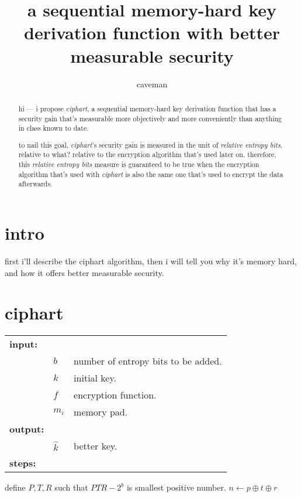 \documentclass{article}
\author{caveman}
\title{a sequential memory-hard key derivation function with better
measurable security}
\begin{document}
\maketitle
\begin{abstract}
hi --- i propose \emph{ciphart}, a sequential memory-hard key derivation
function that has a security gain that's measurable more objectively and
more conveniently than anything in class known to date.

to nail this goal, \emph{ciphart}'s security gain is measured in the unit
of \emph{relative entropy bits}.  relative to what?  relative to the
encryption algorithm that's used later on.  therefore, this \emph{relative
entropy bits} measure is guaranteed to be true when the encryption
algorithm that's used with \emph{ciphart} is also the same one that's used
to encrypt the data afterwards.
\end{abstract}

\section{intro}
first i'll describe the ciphart algorithm, then i will tell you why it's
memory hard, and how it offers better measurable security.

\section{ciphart}

\begin{tabular}{lll}
    \textbf{input:}  & &\\
             & $b$ & number of entropy bits to be added.\\
             & $k$ & initial key.\\
             & $f$ & encryption function.\\
             & $m_i$ & memory pad.\\
    \textbf{output:} & &\\
             & $\hat k$ & better key.\\
    \textbf{steps:}  & &\\
\end{tabular}

\begin{algorithmic}
    \STATE define $P,T,R$ such that $PTR - 2^b$ is smallest positive
    number.
                \STATE $n \leftarrow p \oplus t \oplus r$
            \ENDFOR
        \ENDFOR
    \ENDFOR
\end{algorithmic}
\end{document}
